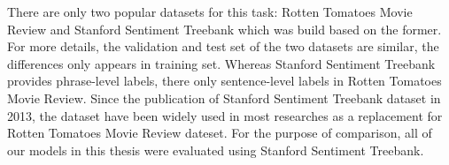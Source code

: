 There are only two popular datasets for this task: Rotten Tomatoes Movie Review\cite{Rotten-Tomato} and Stanford Sentiment Treebank\cite{socher2013recursive} which was build based on the former.
For more details, the validation and test set of the two datasets are similar, the differences only appears in training set.
Whereas Stanford Sentiment Treebank provides phrase-level labels, there only sentence-level labels in Rotten Tomatoes Movie Review\cite{socher2013recursive}.
Since the publication of Stanford Sentiment Treebank dataset in 2013, the dataset have been widely used in most researches as a replacement for Rotten Tomatoes Movie Review dateset\cite{treeLSTM}\cite{KimCNN}\cite{cnn-rnn}\cite{2-layer-cnn}\cite{socher2013recursive}.
For the purpose of comparison, all of our models in this thesis were evaluated using Stanford Sentiment Treebank.

